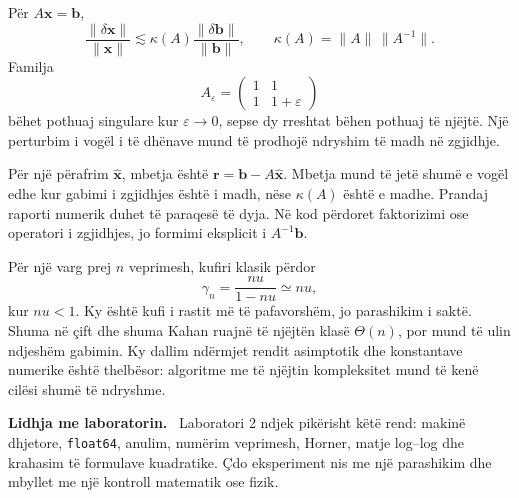 \documentclass[11pt,oneside,openany]{book}
\newcommand{\vect}[1]{\bm{#1}}
\newenvironment{lidhje}{\par\medskip\noindent\textbf{Lidhja me laboratorin.}\ }{\par\medskip}
\begin{document}
Për $A\vect x=\vect b$,
\begin{equation}
 \frac{\|\delta\vect x\|}{\|\vect x\|}
 \lesssim\kappa(A)\frac{\|\delta\vect b\|}{\|\vect b\|},
 \qquad \kappa(A)=\|A\|\,\|A^{-1}\|.
\end{equation}
Familja
\begin{equation}
 A_\varepsilon=
 \begin{pmatrix}1&1\\1&1+\varepsilon\end{pmatrix}
\end{equation}
bëhet pothuaj singulare kur $\varepsilon\to0$, sepse dy rreshtat bëhen
pothuaj të njëjtë. Një perturbim i vogël i të dhënave mund të prodhojë
ndryshim të madh në zgjidhje.

Për një përafrim $\widehat{\vect x}$, mbetja është
$\vect r=\vect b-A\widehat{\vect x}$. Mbetja mund të jetë shumë e vogël edhe
kur gabimi i zgjidhjes është i madh, nëse $\kappa(A)$ është e madhe. Prandaj
raporti numerik duhet të paraqesë të dyja. Në kod përdoret faktorizimi ose
operatori i zgjidhjes, jo formimi eksplicit i $A^{-1}\vect b$.

Për një varg prej $n$ veprimesh, kufiri klasik përdor
\begin{equation}
 \gamma_n=\frac{nu}{1-nu}\simeq nu,
\end{equation}
kur $nu<1$. Ky është kufi i rastit më të pafavorshëm, jo parashikim i saktë.
Shuma në çift dhe shuma Kahan ruajnë të njëjtën klasë $\Theta(n)$, por mund
të ulin ndjeshëm gabimin. Ky dallim ndërmjet rendit asimptotik dhe konstantave
numerike është thelbësor: algoritme me të njëjtin kompleksitet mund të kenë
cilësi shumë të ndryshme.

\begin{lidhje}
Laboratori 2 ndjek pikërisht këtë rend: makinë dhjetore, \texttt{float64},
anulim, numërim veprimesh, Horner, matje log--log dhe krahasim të formulave
kuadratike. Çdo eksperiment nis me një parashikim dhe mbyllet me një kontroll
matematik ose fizik.
\end{lidhje}
\end{document}
